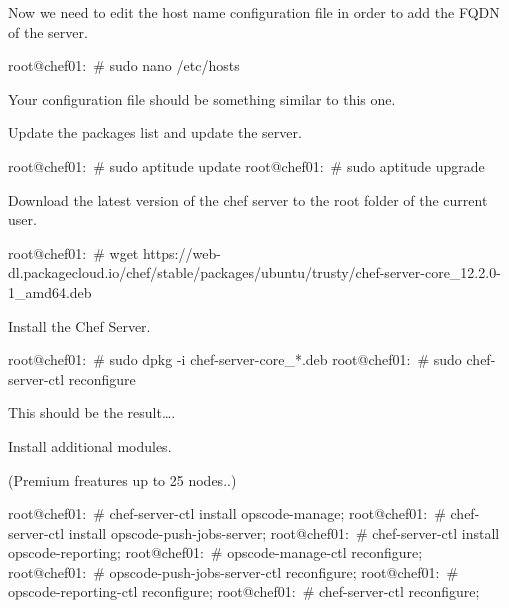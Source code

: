 Now we need to edit the host name configuration file in order to add the FQDN of the server.
\begin{codelisting}
\label{code:}
\codecaption{}
\begin{code}
root@chef01:~# sudo nano /etc/hosts
\end{code}
\end{codelisting}

Your configuration file should be something similar to this one.


Update the packages list and update the server.

\begin{codelisting}
\label{code:}
\codecaption{}
\begin{code}
root@chef01:~# sudo aptitude update
root@chef01:~# sudo aptitude upgrade
\end{code}
\end{codelisting}

Download the latest version of the chef server to the root folder of the current user.

\begin{codelisting}
\label{code:}
\codecaption{}
\begin{code}
root@chef01:~# wget https://web-dl.packagecloud.io/chef/stable/packages/ubuntu/trusty/chef-server-core_12.2.0-1_amd64.deb
\end{code}
\end{codelisting}

Install the Chef Server.

\begin{codelisting}
\label{code:}
\codecaption{}
\begin{code}
root@chef01:~# sudo dpkg -i chef-server-core_*.deb
root@chef01:~# sudo chef-server-ctl reconfigure
\end{code}
\end{codelisting}


This should be the result\ldots{}.

Install additional modules.

(Premium freatures up to 25 nodes..)
\begin{codelisting}
\label{code:}
\codecaption{}
\begin{code}
root@chef01:~# chef-server-ctl install opscode-manage;
root@chef01:~# chef-server-ctl install opscode-push-jobs-server;
root@chef01:~# chef-server-ctl install opscode-reporting;
root@chef01:~# opscode-manage-ctl reconfigure;
root@chef01:~# opscode-push-jobs-server-ctl reconfigure;
root@chef01:~# opscode-reporting-ctl reconfigure; 
root@chef01:~# chef-server-ctl reconfigure;

\end{code}
\end{codelisting}

